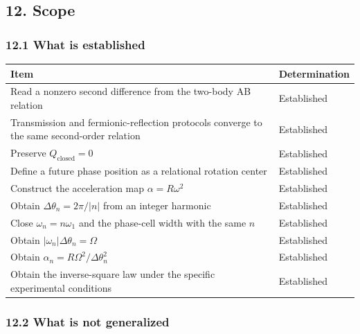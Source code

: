 \documentclass[
  10pt,
  a4paper,
]{article}
\newcounter{none} %
\begin{document}
\subsection{12. Scope}\label{scope}

\subsubsection{12.1 What is established}\label{what-is-established}

{\def\LTcaptype{none} %
\begin{longtable}[]{@{}
  >{\raggedright\arraybackslash}p{}
  >{\raggedright\arraybackslash}p{}@{}}
\toprule\noalign{}
\begin{minipage}[b]{\linewidth}\raggedright
Item
\end{minipage} & \begin{minipage}[b]{\linewidth}\raggedright
Determination
\end{minipage} \\
\midrule\noalign{}
\endhead
\bottomrule\noalign{}
\endlastfoot
Read a nonzero second difference from the two-body AB relation &
Established \\
Transmission and fermionic-reflection protocols converge to the same
second-order relation & Established \\
Preserve \(Q_{\mathrm{closed}}=0\) & Established \\
Define a future phase position as a relational rotation center &
Established \\
Construct the acceleration map \(\alpha=R\omega^2\) & Established \\
Obtain \(\Delta\theta_n=2\pi/\lvert n\rvert\) from an integer harmonic &
Established \\
Close \(\omega_n=n\omega_1\) and the phase-cell width with the same
\(n\) & Established \\
Obtain \(\lvert\omega_n\rvert\Delta\theta_n=\Omega\) & Established \\
Obtain \(\alpha_n=R\Omega^2/\Delta\theta_n^2\) & Established \\
Obtain the inverse-square law under the specific experimental conditions
& Established \\
\end{longtable}
}

\subsubsection{12.2 What is not
generalized}\label{what-is-not-generalized}
\end{document}
